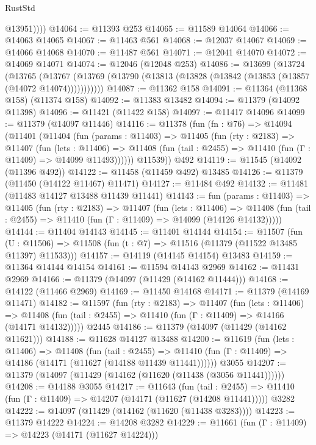 \begin{lexlean}{RustStd}
\begin{coremodule}
            @13951))))
@14064 := @11393 @253
@14065 := @11589 @14064
@14066 := @14063 @14065
@14067 := @11463 @561
@14068 := @12037 @14067
@14069 := @14066 @14068
@14070 := @11487 @561
@14071 := @12041 @14070
@14072 := @14069 @14071
@14074 := @12046 (@12048 @253)
@14086 := @13699
    (@13724
      (@13765
        (@13767 (@13769 (@13790 (@13813 (@13828 (@13842 (@13853 (@13857 (@14072 @14074)))))))))))
@14087 := @11362 @158
@14091 := @11364 (@11368 @158) (@11374 @158)
@14092 := @11383 @13482
@14094 := @11379 (@14092 @11398)
@14096 := @11421 (@11422 @158)
@14097 := @11417 @14096
@14099 := @11379 (@14097 @11446)
@14116 := @11378
    (fun (fn : @76) =>
    @14094
      (@11401
        (@11404
          (fun (params : @11403) =>
          @11405
            (fun (rty : @2183) =>
            @11407
              (fun (lets : @11406) =>
              @11408 (fun (tail : @2455) => @11410 (fun (Γ : @11409) => @14099 @11493))))))
        @11539))
    @492
@14119 := @11545 (@14092 (@11396 @492))
@14122 := @11458 (@11459 @492) @13485
@14126 := @11379 (@11450 (@14122 @11467) @11471)
@14127 := @11484 @492
@14132 := @11481 (@11483 @14127 @13488 @11439 @11441)
@14143 := fun (params : @11403) =>
  @11405
    (fun (rty : @2183) =>
    @11407
      (fun (lets : @11406) =>
      @11408 (fun (tail : @2455) => @11410 (fun (Γ : @11409) => @14099 (@14126 @14132)))))
@14144 := @11404 @14143
@14145 := @11401 @14144
@14154 := @11507
    (fun (U : @11506) => @11508 (fun (t : @7) => @11516 (@11379 (@11522 @13485 @11397) @11533)))
@14157 := @14119 (@14145 @14154) @13483
@14159 := @11364 @14144 @14154
@14161 := @11594 @14143 @2969
@14162 := @11431 @2969
@14166 := @11379 (@14097 (@11429 (@14162 @11444)))
@14168 := @14122 (@11466 @2969)
@14169 := @11450 @14168
@14171 := @11379 (@14169 @11471)
@14182 := @11597
    (fun (rty : @2183) =>
    @11407
      (fun (lets : @11406) =>
      @11408 (fun (tail : @2455) => @11410 (fun (Γ : @11409) => @14166 (@14171 @14132)))))
    @2445
@14186 := @11379 (@14097 (@11429 (@14162 @11621)))
@14188 := @11628 @14127 @13488
@14200 := @11619
    (fun (lets : @11406) =>
    @11408
      (fun (tail : @2455) =>
      @11410 (fun (Γ : @11409) => @14186 (@14171 (@11627 (@14188 @11439 @11441))))))
    @3055
@14207 := @11379 (@14097 (@11429 (@14162 (@11620 (@11438 (@3056 @11441))))))
@14208 := @14188 @3055
@14217 := @11643
    (fun (tail : @2455) => @11410 (fun (Γ : @11409) => @14207 (@14171 (@11627 (@14208 @11441)))))
    @3282
@14222 := @14097 (@11429 (@14162 (@11620 (@11438 @3283))))
@14223 := @11379 @14222
@14224 := @14208 @3282
@14229 := @11661 (fun (Γ : @11409) => @14223 (@14171 (@11627 @14224)))

\end{coremodule}
\end{lexlean}
